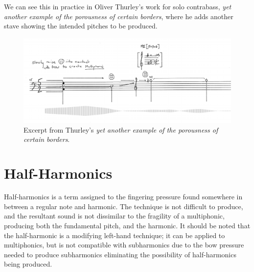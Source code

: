   We can see this in practice in Oliver Thurley's work for solo contrabass, \emph{yet another example of the porousness of certain borders}, where he adds another stave showing the intended pitches to be produced.\autocite{thurleyAnotherExamplePorousness2014}

  \begin{figure}
    \includegraphics[width=\linewidth]{./resources/thurleyMultiphonicNotation.png}
    \caption{Excerpt from Thurley's \emph{yet another example of the porousness of certain borders}.}
\label{fig:Excerpt from Thurley's `yet another example of the porousness of certain borders'}
  \end{figure}

\section{Half-Harmonics}
Half-harmonics is a term assigned to the fingering pressure found somewhere in between a regular note and harmonic. 
The technique is not difficult to produce, and the resultant sound is not dissimilar to the fragility of a multiphonic, producing both the fundamental pitch, and the harmonic. 
It should be noted that the half-harmonic is a modifying left-hand technique; it can be applied to multiphonics, but is not compatible with subharmonics due to the bow pressure needed to produce subharmonics eliminating the possibility of half-harmonics being produced.